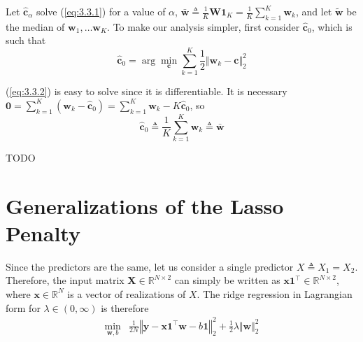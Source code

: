\documentclass{article}
\numberwithin{equation}{section}
\begin{document}
Let $ \hat{\mathbf{c}}_\alpha $ solve (\ref{eq:3.3.1}) for a value of
$ \alpha $, $ \bar{\mathbf{w}} \triangleq \frac{1}{K}\mathbf{W1}_K =
\frac{1}{K}\sum_{k = 1}^K\mathbf{w}_k $, and let $ \tilde{\mathbf{w}} $ be the
median of $ \mathbf{w}_1, \ldots \mathbf{w}_K $. To make our analysis simpler,
first consider $ \hat{\mathbf{c}}_0 $, which is such that
\begin{equation} \label{eq:3.3.2}
    \hat{\mathbf{c}}_0 =
    \arg\min_\mathbf{c}\sum_{k = 1}^K
    \frac{1}{2}\Vert\mathbf{w}_k - \mathbf{c}\Vert_2^2
\end{equation}

(\ref{eq:3.3.2}) is easy to solve since it is differentiable. It is necessary
$ \mathbf{0} = \sum_{k = 1}^K(\mathbf{w}_k - \hat{\mathbf{c}}_0) =
\sum_{k = 1}^K\mathbf{w}_k - K\hat{\mathbf{c}}_0 $, so
\begin{equation} \label{eq:3.3.3}
    \hat{\mathbf{c}}_0 \triangleq
    \frac{1}{K}\sum_{k = 1}^K\mathbf{w}_k \triangleq \bar{\mathbf{w}}
\end{equation}

TODO


\section{Generalizations of the Lasso Penalty}


Since the predictors are the same, let us consider a single predictor
$ X \triangleq X_1 = X_2 $. Therefore, the input matrix
$ \mathbf{X} \in \mathbb{R}^{N \times 2} $ can simply be written as
$ \mathbf{x1}^\top \in \mathbb{R}^{N \times 2} $, where
$ \mathbf{x} \in \mathbb{R}^N $ is a vector of realizations of $ X $. The
ridge regression in Lagrangian form for $ \lambda \in (0, \infty) $ is
therefore
\begin{equation} \label{eq:4.1.1}
    \begin{array}{rl}
        \displaystyle\min_{\mathbf{w}, b} &
        \frac{1}{2N}\left\Vert
            \mathbf{y} - \mathbf{x1}^\top\mathbf{w} - b\mathbf{1}
        \right\Vert_2^2 +
        \frac{1}{2}\lambda\Vert\mathbf{w}\Vert_2^2
    \end{array}
\end{equation}
\end{document}
